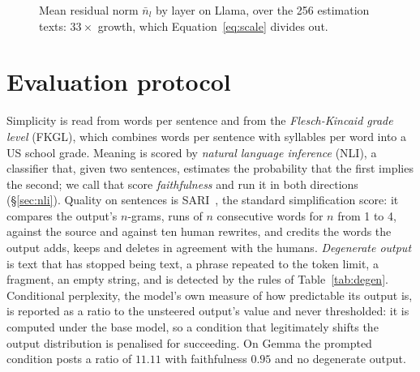\documentclass[aps,prb,reprint,nofootinbib,a4paper]{revtex4-2}
\begin{document}
\begin{figure}[t]
\centering
{}
\caption{Mean residual norm $\bar n_l$ by layer on Llama, over the 256
estimation texts: $33\times$ growth, which Equation~\ref{eq:scale} divides out.}
\label{fig:refnorm}
\end{figure}

\section{Evaluation protocol}
\label{sec:metrics}

Simplicity is read from words per sentence and from the \emph{Flesch-Kincaid
grade level} (FKGL), which combines words per sentence with syllables per word
into a US school grade. Meaning is scored by \emph{natural language inference}
(NLI), a classifier that, given two sentences, estimates the probability that
the first implies the second; we call that score \emph{faithfulness} and run it
in both directions (\S\ref{sec:nli}). Quality on sentences is SARI~\cite{sari},
the standard simplification score: it compares the output's $n$-grams, runs of
$n$ consecutive words for $n$ from 1 to 4, against the source and against ten
human rewrites, and credits the words the output adds, keeps and deletes in
agreement with the humans. \emph{Degenerate output} is text that has stopped
being text, a phrase repeated to the token limit, a fragment, an empty string,
and is detected by the rules of Table~\ref{tab:degen}. Conditional perplexity,
the model's own measure of how predictable its output is, is reported as a
ratio to the unsteered output's value and never thresholded: it is computed
under the base model, so a condition that legitimately shifts the output
distribution is penalised for succeeding. On Gemma the prompted condition posts
a ratio of $11.11$ with faithfulness $0.95$ and no degenerate output.
\end{document}
